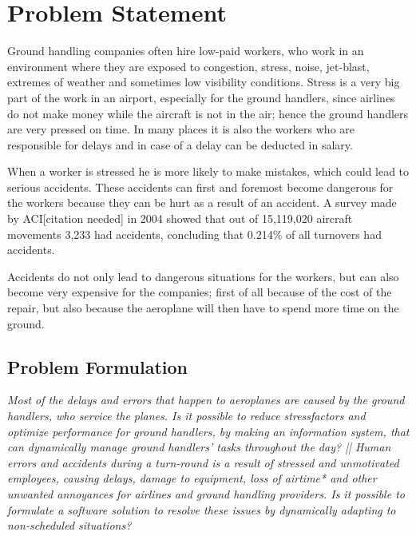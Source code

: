 \section{Problem Statement}

Ground handling companies often hire low-paid workers, who work in an environment where they are exposed to congestion, stress, noise, jet-blast, extremes of weather and sometimes low visibility conditions. Stress is a very big part of the work in an airport, especially for the ground handlers, since airlines do not make money while the aircraft is not in the air; hence the ground handlers are very pressed on time.  In many places it is also the workers who are responsible for delays and in case of a delay can be deducted in salary.

When a worker is stressed he is more likely to make mistakes, which could lead to serious accidents. These accidents can first and foremost become dangerous for the workers because they can be hurt as a result of an accident. A survey made by ACI[citation needed] in 2004 showed that out of 15,119,020 aircraft movements 3,233 had accidents, concluding that 0.214\% of all turnovers had accidents.

Accidents do not only lead to dangerous situations for the workers, but can also become very expensive for the companies; first of all because of the cost of the repair, but also because the aeroplane will then have to spend more time on the ground.
\subsection{Problem Formulation}
\begin{center}
\textit{Most of the delays and errors that happen to aeroplanes are caused by the ground handlers, who service the planes. Is it possible to reduce stressfactors and optimize performance for ground handlers, by making an information system, that can dynamically manage ground handlers' tasks throughout the day? || Human errors and accidents during a turn-round is a result of stressed and unmotivated employees, causing delays, damage to equipment, loss of airtime* and other unwanted annoyances for airlines and ground handling providers. Is it possible to formulate a software solution to resolve these issues by dynamically adapting to non-scheduled situations?}
\end{center}
